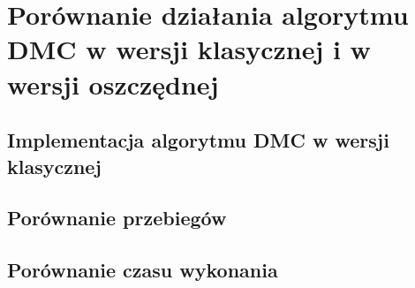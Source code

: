 \chapter{Porównanie działania algorytmu DMC w wersji klasycznej i w wersji oszczędnej}
\label{dmc_porownanie}


\section{Implementacja algorytmu DMC w wersji klasycznej}
\label{dmc_klasyk}


\section{Porównanie przebiegów}
\label{dmc_przebiegi}


\section{Porównanie czasu wykonania}
\label{dmc_czas}